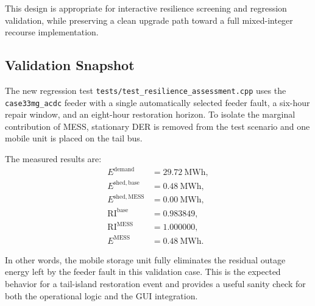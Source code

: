 This design is appropriate for interactive resilience screening and regression
validation, while preserving a clean upgrade path toward a full mixed-integer
recourse implementation.

\subsection{Validation Snapshot}

The new regression test \texttt{tests/test\_resilience\_assessment.cpp} uses the
\texttt{case33mg\_acdc} feeder with a single automatically selected feeder
fault, a six-hour repair window, and an eight-hour restoration horizon. To
isolate the marginal contribution of MESS, stationary DER is removed from the
test scenario and one mobile unit is placed on the tail bus.

The measured results are:
\begin{align}
E^{\mathrm{demand}} &= 29.72\ \text{MWh}, \\
E^{\mathrm{shed,base}} &= 0.48\ \text{MWh}, \\
E^{\mathrm{shed,MESS}} &= 0.00\ \text{MWh}, \\
\mathrm{RI}^{\mathrm{base}} &= 0.983849, \\
\mathrm{RI}^{\mathrm{MESS}} &= 1.000000, \\
E^{\mathrm{MESS}} &= 0.48\ \text{MWh}.
\end{align}

In other words, the mobile storage unit fully eliminates the residual outage
energy left by the feeder fault in this validation case. This is the expected
behavior for a tail-island restoration event and provides a useful sanity check
for both the operational logic and the GUI integration.
